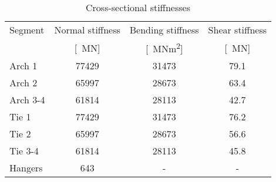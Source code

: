 \begin{table}[H]
\caption{Cross-sectional stiffnesses}
\label{tab:cs_stiffnesses}
\centering
\begin{tabular}{lccc}
\hline
Segment & Normal stiffness & Bending stiffness & Shear stiffness \\
 & [\SI{}{MN}]   & [\SI{}{MNm^2}] & [\SI{}{MN}] \\ \hline
Arch 1 & \SI{77429}{} & \SI{31473}{} & \SI{79.1}{}\\
Arch 2 & \SI{65997}{} & \SI{28673}{} & \SI{63.4}{}\\
Arch 3-4 & \SI{61814}{} & \SI{28113}{} & \SI{42.7}{}\\
Tie 1 & \SI{77429}{} & \SI{31473}{} & \SI{76.2}{}\\
Tie 2 & \SI{65997}{} & \SI{28673}{} & \SI{56.6}{}\\
Tie 3-4 & \SI{61814}{} & \SI{28113}{} & \SI{45.8}{}\\
Hangers & 643 & - & - \\\hline
\end{tabular}
\end{table}